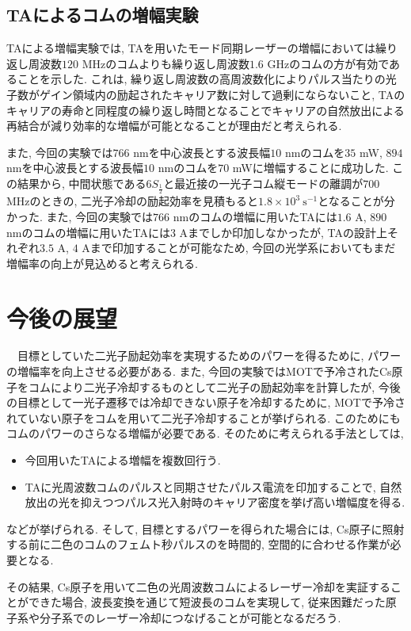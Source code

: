 \documentclass[uplatex, dvipdfmx, a4paper, report, papersize, 11pt]{jsbook}
\begin{document}
\subsection{TAによるコムの増幅実験}
TAによる増幅実験では, TAを用いたモード同期レーザーの増幅においては繰り返し周波数$120$ MHzのコムよりも繰り返し周波数$1.6$ GHzのコムの方が有効であることを示した. これは, 繰り返し周波数の高周波数化によりパルス当たりの光子数がゲイン領域内の励起されたキャリア数に対して過剰にならないこと, TAのキャリアの寿命と同程度の繰り返し時間となることでキャリアの自然放出による再結合が減り効率的な増幅が可能となることが理由だと考えられる. \par
また, 今回の実験では$766$ nmを中心波長とする波長幅$10$ nmのコムを$35$ mW, $894$ nmを中心波長とする波長幅$10$ nmのコムを$70$ mWに増幅することに成功した. この結果から, 中間状態である$6S_{\frac{1}{2}}$と最近接の一光子コム縦モードの離調が$700$ MHzのときの, 二光子冷却の励起効率を見積もると$1.8\times10^3\ \mathrm{s^{-1}}$となることが分かった. また, 今回の実験では$766$ nmのコムの増幅に用いたTAには$1.6$ A, $890$ nmのコムの増幅に用いたTAには$3$ Aまでしか印加しなかったが, TAの設計上それぞれ$3.5$ A, $4$ Aまで印加することが可能なため, 今回の光学系においてもまだ増幅率の向上が見込めると考えられる. \par

\section{今後の展望}
　目標としていた二光子励起効率を実現するためのパワーを得るために, パワーの増幅率を向上させる必要がある. また, 今回の実験ではMOTで予冷されたCs原子をコムにより二光子冷却するものとして二光子の励起効率を計算したが, 今後の目標として一光子遷移では冷却できない原子を冷却するために, MOTで予冷されていない原子をコムを用いて二光子冷却することが挙げられる. このためにもコムのパワーのさらなる増幅が必要である. そのために考えられる手法としては,
\begin{itemize}
  \item 今回用いたTAによる増幅を複数回行う.
  \item TAに光周波数コムのパルスと同期させたパルス電流を印加することで, 自然放出の光を抑えつつパルス光入射時のキャリア密度を挙げ高い増幅度を得る.
\end{itemize}
などが挙げられる.
そして, 目標とするパワーを得られた場合には, Cs原子に照射する前に二色のコムのフェムト秒パルスのを時間的, 空間的に合わせる作業が必要となる. \par
その結果, Cs原子を用いて二色の光周波数コムによるレーザー冷却を実証することができた場合, 波長変換を通じて短波長のコムを実現して, 従来困難だった原子系や分子系でのレーザー冷却につなげることが可能となるだろう.
\end{document}
